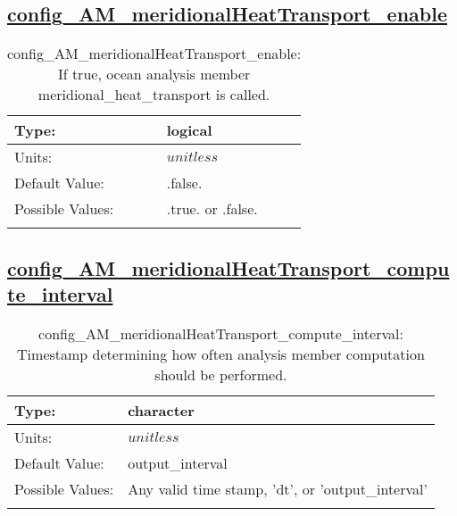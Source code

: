 \subsection[config\_AM\_meridionalHeatTransport\_enable]{\hyperref[sec:nm_tab_AM_meridionalHeatTransport]{config\_AM\_meridionalHeatTransport\_enable}}
\label{subsec:nm_sec_config_AM_meridionalHeatTransport_enable}
\begin{center}
\begin{longtable}{| p{2.0in} || p{4.0in} |}
    \hline
    Type: & logical \\
    \hline
    Units: & $unitless$ \\
    \hline
    Default Value: & .false. \\
    \hline
    Possible Values: & .true. or .false. \\
    \hline
    \caption{config\_AM\_meridionalHeatTransport\_enable: If true, ocean analysis member meridional\_heat\_transport is called.}
\end{longtable}
\end{center}
\subsection[config\_AM\_meridionalHeatTransport\_compute\_interval]{\hyperref[sec:nm_tab_AM_meridionalHeatTransport]{config\_AM\_meridionalHeatTransport\_compute\_interval}}
\label{subsec:nm_sec_config_AM_meridionalHeatTransport_compute_interval}
\begin{center}
\begin{longtable}{| p{2.0in} || p{4.0in} |}
    \hline
    Type: & character \\
    \hline
    Units: & $unitless$ \\
    \hline
    Default Value: & output\_interval \\
    \hline
    Possible Values: & Any valid time stamp, 'dt', or 'output\_interval' \\
    \hline
    \caption{config\_AM\_meridionalHeatTransport\_compute\_interval: Timestamp determining how often analysis member computation should be performed.}
\end{longtable}
\end{center}
